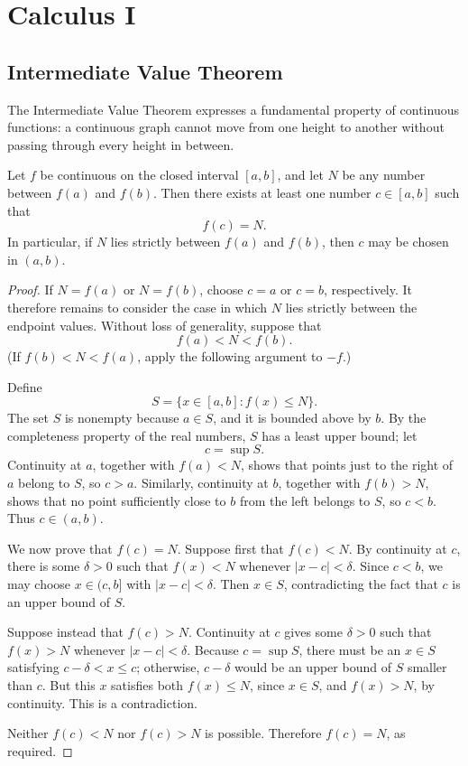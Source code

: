 \chapter{Calculus I}
\section{Intermediate Value Theorem}

The Intermediate Value Theorem expresses a fundamental property of
continuous functions: a continuous graph cannot move from one height to
another without passing through every height in between.

\begin{theorem}
    Let \(f\) be continuous on the closed interval \([a,b]\), and let \(N\)
    be any number between \(f(a)\) and \(f(b)\).  Then there exists at least
    one number \(c\in[a,b]\) such that
    \[
        f(c)=N.
    \]
    In particular, if \(N\) lies strictly between \(f(a)\) and \(f(b)\),
    then \(c\) may be chosen in \((a,b)\).
\end{theorem}
\begin{proof}
    If \(N=f(a)\) or \(N=f(b)\), choose \(c=a\) or \(c=b\), respectively.
    It therefore remains to consider the case in which \(N\) lies strictly
    between the endpoint values.  Without loss of generality, suppose that
    \[
        f(a)<N<f(b).
    \]
    (If \(f(b)<N<f(a)\), apply the following argument to \(-f\).)

    Define
    \[
        S=\{x\in[a,b]:f(x)\leq N\}.
    \]
    The set \(S\) is nonempty because \(a\in S\), and it is bounded above
    by \(b\).  By the completeness property of the real numbers, \(S\) has
    a least upper bound; let
    \[
        c=\sup S.
    \]
    Continuity at \(a\), together with \(f(a)<N\), shows that points just
    to the right of \(a\) belong to \(S\), so \(c>a\).  Similarly,
    continuity at \(b\), together with \(f(b)>N\), shows that no point
    sufficiently close to \(b\) from the left belongs to \(S\), so
    \(c<b\).  Thus \(c\in(a,b)\).

    We now prove that \(f(c)=N\).  Suppose first that \(f(c)<N\).  By
    continuity at \(c\), there is some \(\delta>0\) such that
    \(f(x)<N\) whenever \(|x-c|<\delta\).  Since \(c<b\), we may choose
    \(x\in(c,b]\) with \(|x-c|<\delta\).  Then \(x\in S\), contradicting
    the fact that \(c\) is an upper bound of \(S\).

    Suppose instead that \(f(c)>N\).  Continuity at \(c\) gives some
    \(\delta>0\) such that \(f(x)>N\) whenever \(|x-c|<\delta\).  Because
    \(c=\sup S\), there must be an \(x\in S\) satisfying
    \(c-\delta<x\leq c\); otherwise, \(c-\delta\) would be an upper bound
    of \(S\) smaller than \(c\).  But this \(x\) satisfies both
    \(f(x)\leq N\), since \(x\in S\), and \(f(x)>N\), by continuity.  This
    is a contradiction.

    Neither \(f(c)<N\) nor \(f(c)>N\) is possible.  Therefore \(f(c)=N\),
    as required.
\end{proof}

